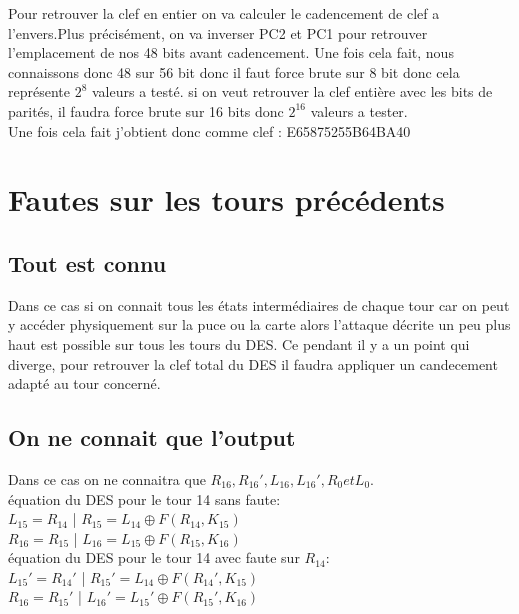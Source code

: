 \documentclass[a4paper]{report}
\begin{document}
			Pour retrouver la clef en entier on va calculer le cadencement de clef a l'envers.Plus précisément, on va inverser PC2 et PC1 pour retrouver l'emplacement de nos 48 bits avant cadencement. Une fois cela fait, nous connaissons donc 48 sur 56 bit donc il faut force brute sur 8 bit donc cela représente $2^{8}$ valeurs a testé. si on veut retrouver la clef entière avec les bits de parités, il faudra force brute sur 16 bits donc $2^{16}$ valeurs a tester.\\
			Une fois cela fait j'obtient donc comme clef : E65875255B64BA40
		
		\chapter{Fautes sur les tours précédents}
			\section{Tout est connu}
			Dans ce cas si on connait tous les états intermédiaires de chaque tour car on peut y accéder physiquement sur la puce ou la carte alors l'attaque décrite un peu plus haut est possible sur tous les tours du DES. Ce pendant il y a un point qui diverge, pour retrouver la clef total du DES il faudra appliquer un candecement adapté au tour concerné.
			
			\section{On ne connait que l'output}
			Dans ce cas on ne connaitra que $R_{16},R_{16}',L_{16},L_{16}',R_{0} et L_{0}$.\\
			
			équation du DES pour le tour 14 sans faute:\\
			$L_{15}=R_{14}$ | $R_{15}=L_{14}\oplus F(R_{14},K_{15})$\\
			$R_{16}=R_{15}$ | $L_{16}=L_{15}\oplus F(R_{15},K_{16})$\\
			équation du DES pour le tour 14 avec faute sur $R_{14}$:\\
			$L_{15}'=R_{14}'$ | $R_{15}'=L_{14}\oplus F(R_{14}',K_{15})$\\
			$R_{16}=R_{15}'$ | $L_{16}'=L_{15}'\oplus F(R_{15}',K_{16})$\\
			
\end{document}
